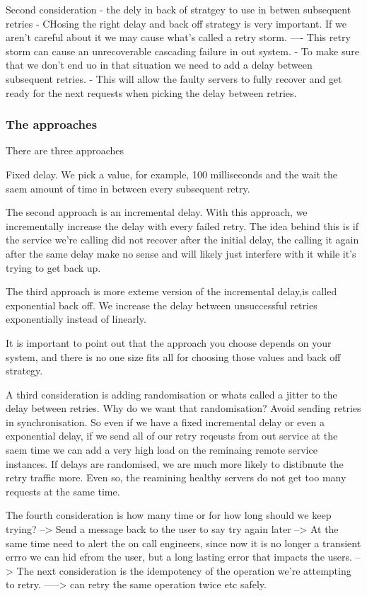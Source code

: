 \documentclass[a4paper, 11pt]{book}
\begin{document}
{    Second consideration
    - the dely in back of stratgey to use in betwen subsequent retries
    - CHosing the right delay and back off strategy is very important.
    If we aren't careful about it we may cause what's called a retry storm.
    ---- This retry storm can cause an unrecoverable cascading failure in out system.
    - To make sure that we don't end uo in that situation we need to add a delay between subsequent retries.
    - This will allow the faulty servers to fully recover and get ready for the next requests when picking the delay between retries.

    \subsubsection{The approaches}
    There are three approaches

    Fixed delay. We pick a value, for example, 100 milliseconds and the wait the saem amount of time in between every subsequent retry.

    The second approach is an incremental delay.
    With this approach, we incrementally increase the delay with every failed retry.
    The idea behind this is if the service we're calling did not recover after the initial delay, the calling it again after the same delay make no sense and will likely just interfere with it while it's trying to get back up.

    The third approach is more exteme version of the incremental delay,is called exponential back off.
    We increase the delay between unsuccessful retries exponentially instead of linearly.

    It is important to point out that the approach you choose depends on your system, and there is no one size fits all for choosing those values and back off strategy.

    A third consideration is adding randomisation or whats called a jitter to the delay between retries.
    Why do we want that randomisation?
    Avoid sending retries in synchronisation.
    So even if we have a fixed incremental delay or even a exponential delay, if we send all of our retry reqeusts from out service at the saem time we can add a very high load on the reminaing remote service instances.
    If delays are randomised, we are much more likely to distibnute the retry traffic more.
    Even so, the reamining healthy servers do not get too many requests at the same time.

    The fourth consideration is how many time or for how long should we keep trying?
    --> Send a message back to the user to say try again later
    -->  At the same time need to alert the on call engineers, since now it is no longer a transient errro we can hid efrom the user, but a long lasting error that impacts the users.
    --> The next consideration is the idempotency of the operation we're attempting to retry.
    -----> can retry the same operation twice etc safely.

}
\end{document}
